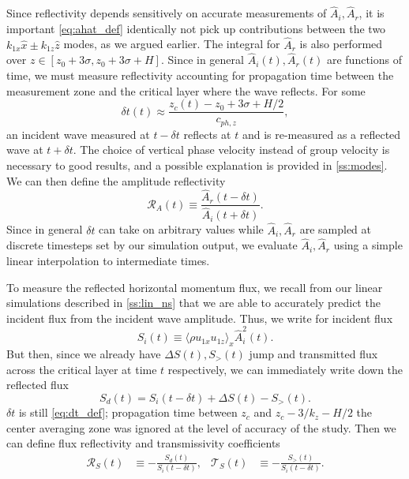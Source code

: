 \documentclass[
        fleqn,
        usenatbib,
    ]{mnras}
\newcommand*{\ev}[1]{\langle#1\rangle}
\begin{document}
Since reflectivity depends sensitively on accurate measurements of $\hat{A}_i,
\hat{A}_r$, it is important \autoref{eq:ahat_def} identically not pick up
contributions between the two $k_{1x}\hat{x} \pm k_{1z}\hat{z}$ modes, as we
argued earlier. The integral for $\hat{A}_r$ is also performed over $z \in [z_0
+ 3\sigma, z_0 + 3\sigma + H]$. Since in general $\hat{A}_i(t), \hat{A}_r(t)$
are functions of time, we must measure reflectivity accounting for propagation
time between the measurement zone and the critical layer where the wave
reflects. For some
\begin{equation}
    \delta t(t) \approx \frac{z_c(t) - z_0 + 3\sigma + H/2}{c_{ph, z}},
        \label{eq:dt_def}
\end{equation}
an incident wave measured at $t - \delta t$ reflects at $t$ and is re-measured
as a reflected wave at $t + \delta t$. The choice of vertical phase velocity
instead of group velocity is necessary to good results, and a possible
explanation is provided in \autoref{ss:modes}. We can then define the amplitude
reflectivity
\begin{equation}
    \mathcal{R}_A(t) \equiv \frac{\hat{A}_r(t - \delta t)}{\hat{A}_i(t +
        \delta t)}.\label{eq:Ra_def}
\end{equation}
Since in general $\delta t$ can take on arbitrary values while $\hat{A}_i,
\hat{A}_r$ are sampled at discrete timesteps set by our simulation output, we
evaluate $\hat{A}_i, \hat{A}_r$ using a simple linear interpolation to
intermediate times.

To measure the reflected horizontal momentum flux, we recall from our linear
simulations described in \autoref{ss:lin_ns} that we are able to accurately
predict the incident flux from the incident wave amplitude. Thus, we write for
incident flux
\begin{equation}
    S_i(t) \equiv \ev{\rho u_{1x} u_{1z}}_x\hat{A}_i^2(t).
\end{equation}
But then, since we already have $\Delta S(t), S_>(t)$ jump and transmitted flux
across the critical layer at time $t$ respectively, we can immediately write
down the reflected flux
\begin{equation}
    S_d(t) = S_i(t - \delta t) + \Delta S(t) - S_>(t).
\end{equation}
$\delta t$ is still \autoref{eq:dt_def}; propagation time between $z_c$ and $z_c
- 3/k_z - H/2$ the center averaging zone was ignored at the level of accuracy of
the study. Then we can define flux reflectivity and transmissivity coefficients
\begin{align}
    \mathcal{R}_S(t) &\equiv -\frac{S_d(t)}{S_i(t - \delta t)},&
    \mathcal{T}_S(t) &\equiv -\frac{S_>(t)}{S_i(t - \delta t)}.
        \label{eq:srefl_def}
\end{align}
\end{document}
